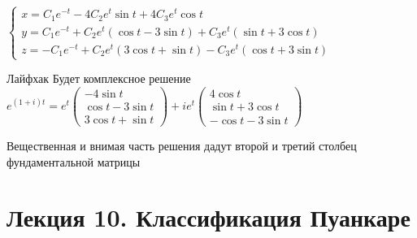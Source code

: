 \documentclass[12pt]{article}
\begin{document}
\begin{Example}{}
    $\begin{cases}
        x = C_1e^{-t} - 4C_2e^t \sin t + 4C_3e^t \cos t \\
        y = C_1e^{-t} + C_2e^t (\cos t - 3\sin t) + C_3e^t (\sin t + 3\cos t) \\
        z = -C_1e^{-t} + C_2e^t (3\cos t + \sin t) - C_3e^t (\cos t + 3\sin t)
    \end{cases}$
\end{Example}

\begin{nota}{Лайфхак}
    Будет комплексное решение $e^{(1 + i)t} = e^t \begin{pmatrix}
        -4\sin t \\
        \cos t - 3\sin t \\
        3\cos t + \sin t
    \end{pmatrix} + ie^t \begin{pmatrix}
        4\cos t \\
        \sin t + 3\cos t \\
        -\cos t - 3\sin t
    \end{pmatrix}$
    
    Вещественная и внимая часть решения дадут второй и третий столбец фундаментальной матрицы
\end{nota}

\newpage 

\section{Лекция 10. Классификация Пуанкаре}
\end{document}
